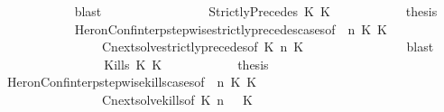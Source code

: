 \begin{isabellebody}
\ \ \ \ \ \ \ \ \ \ \isamarkupfalse%
\ blast\isanewline
\ \ \ \ \ \ \isamarkupfalse%
\isanewline
\ \ \ \ \ \ \ \ \isamarkupfalse%
\ {\isacharparenleft}StrictlyPrecedes\ K{}\ K{}{\isacharparenright}\isanewline
\ \ \ \ \ \ \ \ \isamarkupfalse%
\ \isamarkupfalse%
\ {\isacharquery}thesis\isanewline
\ \ \ \ \ \ \ \ \ \ \isamarkupfalse%
\ HeronConf{\isacharunderscore}interp{\isacharunderscore}stepwise{\isacharunderscore}strictly{\isacharunderscore}precedes{\isacharunderscore}cases{\isacharbrackleft}of\ {\isacartoucheopen}{\isasymGamma}{\isacartoucheclose}\ {\isacartoucheopen}n{\isacartoucheclose}\ {\isacartoucheopen}K{}{\isacartoucheclose}\ {\isacartoucheopen}K{}{\isacartoucheclose}\ {\isacartoucheopen}{\isasymPsi}{\isacartoucheclose}\ {\isacartoucheopen}{\isasymPhi}{\isacartoucheclose}{\isacharbrackright}\isanewline
\ \ \ \ \ \ \ \ \ \ \ \ \ \ \ \ Cnext{\isacharunderscore}solve{\isacharunderscore}strictly{\isacharunderscore}precedes{\isacharbrackleft}of\ {\isacartoucheopen}K{}{\isacartoucheclose}\ {\isacartoucheopen}n{\isacartoucheclose}\ {\isacartoucheopen}K{}{\isacartoucheclose}\ {\isacartoucheopen}{\isasymGamma}{\isacartoucheclose}\ {\isacartoucheopen}{\isasymPsi}{\isacartoucheclose}\ \ {\isacartoucheopen}{\isasymPhi}{\isacartoucheclose}{\isacharbrackright}\isanewline
\ \ \ \ \ \ \ \ \ \ \isamarkupfalse%
\ blast\isanewline
\ \ \ \ \ \ \isamarkupfalse%
\isanewline
\ \ \ \ \ \ \ \ \isamarkupfalse%
\ {\isacharparenleft}Kills\ K{}\ K{}{\isacharparenright}\isanewline
\ \ \ \ \ \ \ \ \isamarkupfalse%
\ \isamarkupfalse%
\ {\isacharquery}thesis\isanewline
\ \ \ \ \ \ \ \ \ \ \isamarkupfalse%
\ HeronConf{\isacharunderscore}interp{\isacharunderscore}stepwise{\isacharunderscore}kills{\isacharunderscore}cases{\isacharbrackleft}of\ {\isacartoucheopen}{\isasymGamma}{\isacartoucheclose}\ {\isacartoucheopen}n{\isacartoucheclose}\ {\isacartoucheopen}K{}{\isacartoucheclose}\ {\isacartoucheopen}K{}{\isacartoucheclose}\ {\isacartoucheopen}{\isasymPsi}{\isacartoucheclose}\ {\isacartoucheopen}{\isasymPhi}{\isacartoucheclose}{\isacharbrackright}\isanewline
\ \ \ \ \ \ \ \ \ \ \ \ \ \ \ \ Cnext{\isacharunderscore}solve{\isacharunderscore}kills{\isacharbrackleft}of\ {\isacartoucheopen}K{}{\isacartoucheclose}\ {\isacartoucheopen}n{\isacartoucheclose}\ {\isacartoucheopen}{\isasymGamma}{\isacartoucheclose}\ {\isacartoucheopen}{\isasymPsi}{\isacartoucheclose}\ {\isacartoucheopen}K{}{\isacartoucheclose}\ {\isacartoucheopen}{\isasymPhi}{\isacartoucheclose}{\isacharbrackright}\ \isamarkupfalse%

\end{isabellebody}
